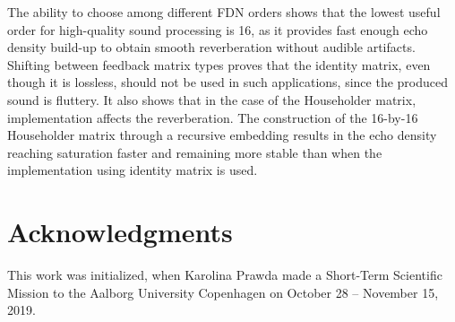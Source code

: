 \documentclass[twoside,a4paper]{article}
\begin{document}
The ability to choose among different FDN orders shows that the lowest useful order for high-quality sound processing is 16, as it provides fast enough echo density build-up to obtain smooth reverberation without audible artifacts. Shifting between feedback matrix types proves that the identity matrix, even though it is lossless, should not be used in such applications, since the produced sound is fluttery. It also shows that in the case of the Householder matrix, implementation affects the reverberation. The construction of the 16-by-16 Householder matrix through a recursive embedding results in the echo density reaching saturation faster and remaining more stable than when the implementation using identity matrix is used.

\section{Acknowledgments}
This work was initialized, when Karolina Prawda made a Short-Term Scientific Mission to the Aalborg University Copenhagen on October 28 -- November 15, 2019. 


\end{document}
